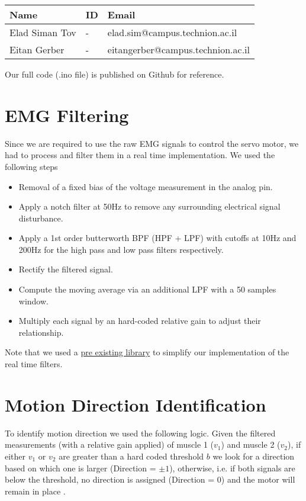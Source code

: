 \documentclass[10pt]{article}
\begin{document}
\begin{table}[h]
    \centering
    \begin{tabular}{l l l}
        \hline
        Name & ID & Email \\
        \hline
        Elad Siman Tov & - & elad.sim@campus.technion.ac.il \\
        \hline
        Eitan Gerber & - & eitangerber@campus.technion.ac.il \\
        \hline
    \end{tabular}
    \label{tab:personal_info}
\end{table}
Our full code (.ino file) is published on Github for reference.

\section{EMG Filtering}
Since we are required to use the raw EMG signals to control the servo motor, we had to process and filter them in a real time implementation. We used the following steps
\begin{itemize}
    \item Removal of a fixed bias of the voltage measurement in the analog pin.  
    \item Apply a notch filter at 50Hz to remove any surrounding electrical signal disturbance.
    \item Apply a 1st order butterworth BPF (HPF + LPF) with cutoffs at 10Hz and 200Hz for the high pass and low pass filters respectively.
    \item Rectify the filtered signal.
    \item Compute the moving average via an additional LPF with a 50 samples window.
    \item Multiply each signal by an hard-coded relative gain to adjust their relationship.  
\end{itemize}
Note that we used a \href{https://github.com/tttapa/Arduino-Filters}{pre existing library} to simplify our implementation of the real time filters. 
\section{Motion Direction Identification}
To identify motion direction we used the following logic. Given the filtered measurements (with a relative gain applied) of muscle 1 ($v_1$) and muscle 2 ($v_2$), if either $v_1$ or $v_2$ are greater than a hard coded threshold $b$ we look for a direction based on which one is larger (Direction = $\pm1$), otherwise, i.e. if both signals are below the threshold, no direction is assigned (Direction = $0$) and the motor will remain in place .
\end{document}
